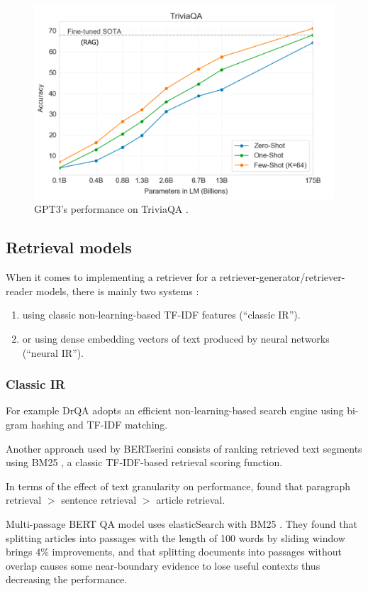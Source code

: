 \documentclass[a4paper,12pt]{article}
\begin{document}
\begin{figure}
	\centering
	\includegraphics[width=0.8\linewidth]{figures/gpt3-triviaqa.png}
	\caption{GPT3's performance on TriviaQA \cite{triviaqa}. \cite{gpt3}}
	\label{fig:gpt3}
\end{figure}

\subsection{Retrieval models}
When it comes to implementing a retriever for a retriever-generator/retriever-reader models, there is mainly two systems : 
\begin{enumerate}
	\item using classic non-learning-based TF-IDF features (“classic IR”).
	\item or using dense embedding vectors of text produced by neural networks (“neural IR”).
\end{enumerate}

\subsubsection{Classic IR}
For example DrQA \cite{drqa} adopts an efficient non-learning-based search engine using bi-gram hashing
and TF-IDF matching.

Another approach used by BERTserini \cite{BERTserini} consists of ranking retrieved text segments using BM25 \cite{BM25}, a classic TF-IDF-based retrieval scoring function.

In terms of the effect of text granularity on performance, \cite{BERTserini} found that paragraph retrieval $>$ sentence retrieval $>$ article retrieval.

Multi-passage BERT QA model \cite{multibert} uses elasticSearch with BM25 \cite{BM25}. They found that splitting articles into passages with the length of 100 words by sliding window brings $4\%$ improvements, and that splitting documents into passages without overlap causes some near-boundary evidence to lose useful contexts thus decreasing the performance.
\end{document}
